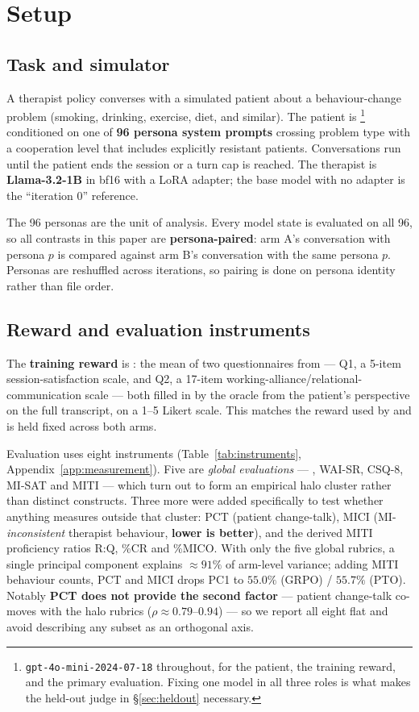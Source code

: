 \section{Setup}
\label{sec:setup}

\subsection{Task and simulator}
A therapist policy converses with a simulated patient about a behaviour-change problem
(smoking, drinking, exercise, diet, and similar). The patient is
\primaryjudge{}\footnote{\texttt{gpt-4o-mini-2024-07-18} throughout, for the patient, the
training reward, and the primary evaluation. Fixing one model in all three roles is what
makes the held-out judge in \S\ref{sec:heldout} necessary.} conditioned on one of \textbf{96
persona system prompts} crossing problem type with a cooperation level that includes
explicitly resistant patients. Conversations run until the patient ends the session or a
turn cap is reached. The therapist is \textbf{Llama-3.2-1B} in bf16 with a LoRA adapter; the
base model with no adapter is the ``iteration 0'' reference.

The 96 personas are the unit of analysis. Every model state is evaluated on all 96, so all
contrasts in this paper are \textbf{persona-paired}: arm A's conversation with persona $p$ is
compared against arm B's conversation with the same persona $p$. Personas are reshuffled
across iterations, so pairing is done on persona identity rather than file order.

\subsection{Reward and evaluation instruments}
The \textbf{training reward} is \QQ{}: the mean of two questionnaires from
\citet{yosef2024assessing} --- Q1, a 5-item session-satisfaction scale, and Q2, a 17-item
working-alliance/relational-communication scale --- both filled in by the oracle from the
patient's perspective on the full transcript, on a 1--5 Likert scale. This matches the reward
used by \citet{baruch2025pto} and is held fixed across both arms.

Evaluation uses eight instruments (Table~\ref{tab:instruments}, Appendix~\ref{app:measurement}).
Five are \emph{global evaluations} --- \QQ{}, WAI-SR, CSQ-8, MI-SAT and MITI --- which turn out
to form an empirical halo cluster rather than distinct constructs. Three more were added
specifically to test whether anything measures outside that cluster: PCT (patient change-talk),
MICI (MI-\emph{inconsistent} therapist behaviour, \textbf{lower is better}), and the derived
MITI proficiency ratios R:Q, \%CR and \%MICO. With only the five
global rubrics, a single principal component explains ${\approx}91\%$ of arm-level variance;
adding MITI behaviour counts, PCT and MICI drops PC1 to $55.0\%$ (GRPO) / $55.7\%$ (PTO).
Notably \textbf{PCT does not provide the second factor} --- patient change-talk co-moves with
the halo rubrics ($\rho\approx0.79$--$0.94$) --- so we report all eight flat and avoid
describing any subset as an orthogonal axis.



